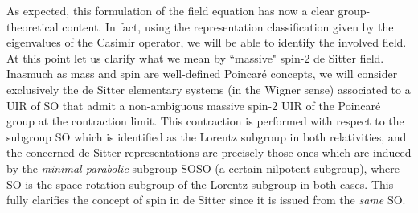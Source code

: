 \documentclass[a4paper,11pt,showpacs,preprintnumbers]{revtex4}
\begin{document}
As expected, this formulation of the field equation has now a
clear group-theoretical content. In fact, using the representation
classification given by the eigenvalues of the Casimir operator,
we will be able to identify the involved field. At this point let
us clarify what we mean by ``massive" spin-2 de Sitter field.
Inasmuch as mass and  spin are well-defined Poincar\'e concepts,
we will consider exclusively  the de Sitter elementary systems (in
the Wigner sense) associated to a UIR of SO\coordHE{} that admit
a non-ambiguous  massive spin-2 UIR of the Poincar\'e group at the
\coordHE{} contraction limit. This contraction is performed with
respect to the  subgroup SO\coordHE{} which is identified as the
Lorentz subgroup in both relativities, and the concerned de Sitter
representations are precisely those ones which are induced by the
{\it minimal parabolic} \cite{lipsman} subgroup SO\coordHE{}SO
\coordHE{}(a certain nilpotent subgroup), where SO\coordHE{}
\underline{is} the space rotation subgroup of the Lorentz subgroup
in both cases. This fully clarifies the concept of spin in de
Sitter since it is issued from the {\it same} SO\coordHE{}.
\end{document}
